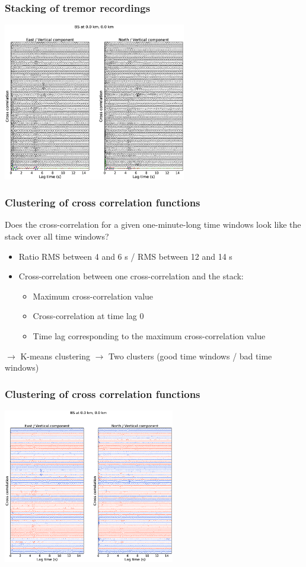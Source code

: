 \documentclass{beamer}
\begin{document}
	\begin{frame}
		\frametitle{Stacking of tremor recordings}
		\begin{center}
			\includegraphics[width=8cm, trim={5cm 2cm 5cm 3.5cm}, clip]{BS_000_000/BS_000_000_lin.eps}
		\end{center}
	\end{frame}
		
	\begin{frame}
		\frametitle{Clustering of cross correlation functions} 
		Does the cross-correlation for a given one-minute-long time windows look like the stack over all time windows?

		\begin{itemize}
			\item Ratio RMS between 4 and 6 s / RMS between 12 and 14 s
			\item Cross-correlation between one cross-correlation and the stack:
			\begin{itemize}
				\item Maximum cross-correlation value
				\item Cross-correlation at time lag 0
				\item Time lag corresponding to the maximum cross-correlation value
			\end{itemize}
		\end{itemize}

		$\rightarrow$ K-means clustering $\rightarrow$ Two clusters (good time windows / bad time windows)
	\end{frame}

	\begin{frame}
		\frametitle{Clustering of cross correlation functions}
		\begin{center}
			\includegraphics[width=7.5cm, trim={5cm 2.5cm 5cm 4cm}, clip]{BS_000_000/BS_000_000_PWS_PWS_cluster_ccwin.eps}
		\end{center}
	\end{frame}
\end{document}
